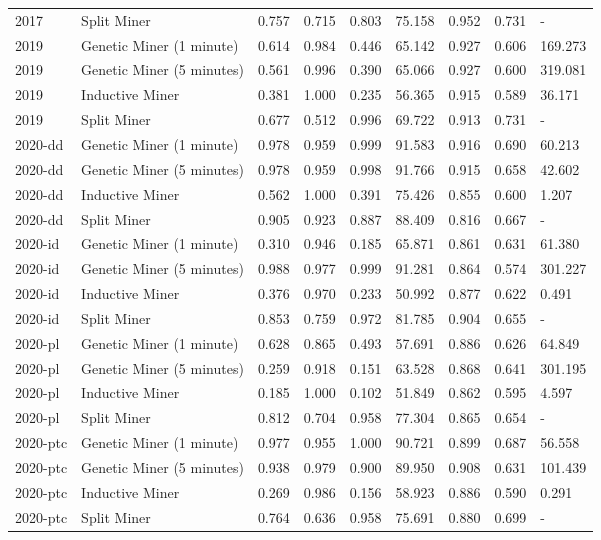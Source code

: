 \begin{tabular}{llrrrrrrl}
2017 & Split Miner & 0.757 & 0.715 & 0.803 & 75.158 & 0.952 & 0.731 & - \\
2019 & Genetic Miner (1 minute) & 0.614 & 0.984 & 0.446 & 65.142 & 0.927 & 0.606 & 169.273 \\
2019 & Genetic Miner (5 minutes) & 0.561 & 0.996 & 0.390 & 65.066 & 0.927 & 0.600 & 319.081 \\
2019 & Inductive Miner & 0.381 & 1.000 & 0.235 & 56.365 & 0.915 & 0.589 & 36.171 \\
2019 & Split Miner & 0.677 & 0.512 & 0.996 & 69.722 & 0.913 & 0.731 & - \\
2020-dd & Genetic Miner (1 minute) & 0.978 & 0.959 & 0.999 & 91.583 & 0.916 & 0.690 & 60.213 \\
2020-dd & Genetic Miner (5 minutes) & 0.978 & 0.959 & 0.998 & 91.766 & 0.915 & 0.658 & 42.602 \\
2020-dd & Inductive Miner & 0.562 & 1.000 & 0.391 & 75.426 & 0.855 & 0.600 & 1.207 \\
2020-dd & Split Miner & 0.905 & 0.923 & 0.887 & 88.409 & 0.816 & 0.667 & - \\
2020-id & Genetic Miner (1 minute) & 0.310 & 0.946 & 0.185 & 65.871 & 0.861 & 0.631 & 61.380 \\
2020-id & Genetic Miner (5 minutes) & 0.988 & 0.977 & 0.999 & 91.281 & 0.864 & 0.574 & 301.227 \\
2020-id & Inductive Miner & 0.376 & 0.970 & 0.233 & 50.992 & 0.877 & 0.622 & 0.491 \\
2020-id & Split Miner & 0.853 & 0.759 & 0.972 & 81.785 & 0.904 & 0.655 & - \\
2020-pl & Genetic Miner (1 minute) & 0.628 & 0.865 & 0.493 & 57.691 & 0.886 & 0.626 & 64.849 \\
2020-pl & Genetic Miner (5 minutes) & 0.259 & 0.918 & 0.151 & 63.528 & 0.868 & 0.641 & 301.195 \\
2020-pl & Inductive Miner & 0.185 & 1.000 & 0.102 & 51.849 & 0.862 & 0.595 & 4.597 \\
2020-pl & Split Miner & 0.812 & 0.704 & 0.958 & 77.304 & 0.865 & 0.654 & - \\
2020-ptc & Genetic Miner (1 minute) & 0.977 & 0.955 & 1.000 & 90.721 & 0.899 & 0.687 & 56.558 \\
2020-ptc & Genetic Miner (5 minutes) & 0.938 & 0.979 & 0.900 & 89.950 & 0.908 & 0.631 & 101.439 \\
2020-ptc & Inductive Miner & 0.269 & 0.986 & 0.156 & 58.923 & 0.886 & 0.590 & 0.291 \\
2020-ptc & Split Miner & 0.764 & 0.636 & 0.958 & 75.691 & 0.880 & 0.699 & - \\

\end{tabular}
